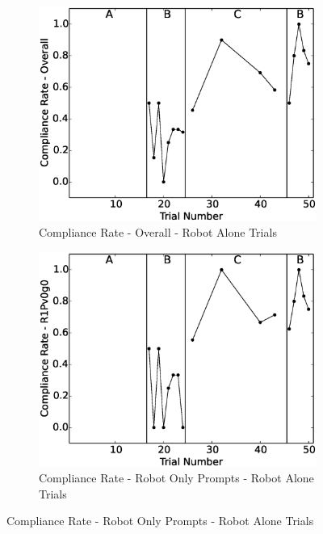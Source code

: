 \documentclass{ut-thesis}
\begin{document}
\begin{figure}[h]
	\centering
	\begin{subfigure}[b]{0.49\textwidth}
		\includegraphics[width=1.1\linewidth]{./img/data_analysis/102ComplianceRate-Overall_robotAloneOnly.eps}
		\caption{Compliance Rate - Overall - Robot Alone Trials}
		\label{fig:102ComplianceRate-Overall_robotAloneOnly}
	\end{subfigure}
	\hfill
	\begin{subfigure}[b]{0.49\textwidth}
		\includegraphics[width=1.1\linewidth]{./img/data_analysis/79ComplianceRate-R1Pv0g0_robotAloneOnly.eps}
		\caption{Compliance Rate - Robot Only Prompts - Robot Alone Trials}
		\label{fig:79ComplianceRate-R1Pv0g0_robotAloneOnly}
	\end{subfigure}%


\end{figure}
\end{document}

